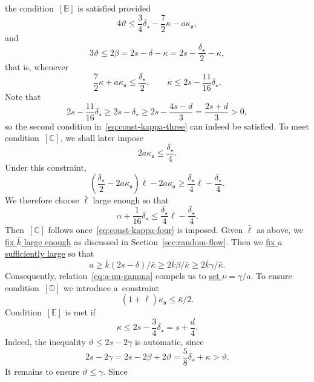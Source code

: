 \documentclass{article}
\numberwithin{equation}{section}
\theoremstyle{plain}
\theoremstyle{definition}
\begin{document}
the condition~$[\mathbb{B}]$ is satisfied provided
\[ 4 \vartheta \leqslant \frac{3}{4} \delta_{\star} - \frac{7}{2} \kappa - a
   \kappa_{\mathfrak{o}}, \]
and
\[ 3 \vartheta \leqslant 2 \beta = 2 s - \delta - \kappa = 2 s -
   \frac{\delta_{\star}}{2} - \kappa, \]
that is, whenever
\begin{equation}
  \frac{7}{2} \kappa + a \kappa_{\mathfrak{o}} \leqslant
  \frac{\delta_{\star}}{2}, \qquad \kappa \leqslant 2 s - \frac{11}{16}
  \delta_{\star} . \label{eq:const-kappa-three}
\end{equation}
Note that
\[ 2 s - \frac{11}{16} \delta_{\star} \geqslant 2 s - \delta_{\star} \geqslant
   2 s - \frac{4 s - d}{3} = \frac{2 s + d}{3} > 0, \]
so the second condition in~\eqref{eq:const-kappa-three} can indeed be
satisfied. To meet condition~$[\mathbb{C}]$, we shall later impose
\begin{equation}
	2a\kappa_{\mathfrak{o}}\leqslant \frac{\delta_\star}{4}.
	\label{eq:const-kappa-four}
\end{equation}
Under this constraint,
\[
\left(
\frac{\delta_\star}{2}-2a\kappa_{\mathfrak{o}}
\right)\bar\ell
-2a\kappa_{\mathfrak{o}}
\geqslant
\frac{\delta_\star}{4}\bar\ell
-\frac{\delta_\star}{4}.
\]
We therefore choose $\bar\ell$ large enough so that
\[
\alpha+\frac{1}{16}\delta_\star
\leqslant
\frac{\delta_\star}{4}\bar\ell
-\frac{\delta_\star}{4}.
\]
Then~$[\mathbb{C}]$ follows once~\eqref{eq:const-kappa-four} is imposed.
Given $\bar{\ell}$ as above, we \underline{fix $\bar{k}$ large enough} as discussed
in Section~\ref{sec:random-flow}. Then we \underline{fix $a$ sufficiently large} so that
\[ a \geqslant \bar{k} (2 s - \delta) / \bar{\kappa}
   \geqslant 2 \bar{k} \beta / \bar{\kappa} \geqslant 2 \bar{k} \gamma /
   \bar{\kappa}. \]
Consequently, relation~\eqref{eq:a-nu-gamma} compels us to \underline{set
$\nu = \gamma / a$}. To ensure condition~$[\mathbb{D}]$ we
introduce a~constraint
\begin{equation}
  (1 + \bar{\ell}) \kappa_{\mathfrak{o}} \leqslant \bar{\kappa} / 2.
  \label{eq:const-kappa-one}
\end{equation}
Condition~$[\mathbb{E}]$ is met if
\begin{equation}
	\kappa\leqslant 2s-\frac34\delta_\star
	=s+\frac d4 .
	\label{eq:const-kappa-five}
\end{equation}
Indeed, the inequality $\vartheta\leqslant 2s-2\gamma$ is automatic, since
\[
2s-2\gamma
=
2s-2\beta+2\vartheta
=
\frac{5}{8}\delta_\star+\kappa
>
\vartheta .
\]
It remains to ensure $\vartheta\leqslant\gamma$. Since
\end{document}

